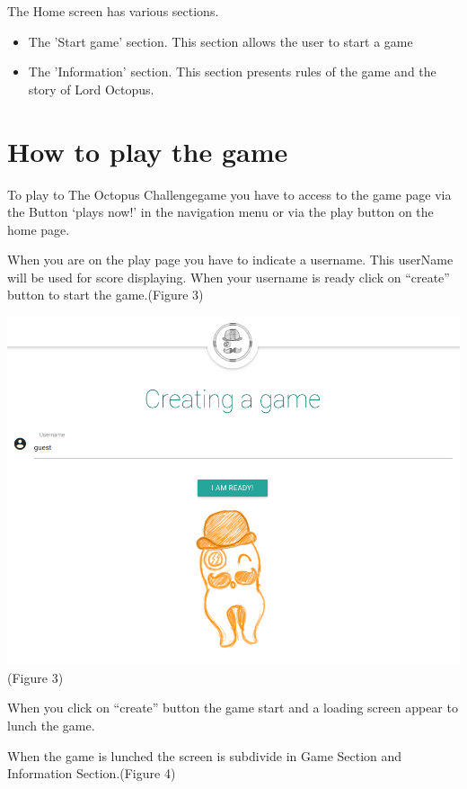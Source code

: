 \documentclass[a4paper,11pt, oneside]{book}
\def\appName{The Octopus Challenge}
\def\octopusName{Lord Octopus}
\begin{document}
The Home screen has various sections.
\begin{itemize}
	\item The 'Start game' section. This section allows the user to start a game
	\item The 'Information' section. This section presents rules of the game and the story of \octopusName.
\end{itemize}


	\section{How to play the game}

	To play to \appName game you have to access to the game page via the Button ‘plays now!’ in the navigation menu or via the play button on the home page.

When you are on the play page you have to indicate a username.
This userName will be used for score displaying.
When your username is ready click on “create” button to start the game.(Figure 3)

\begin{center}
	\includegraphics[width=1\textwidth]{CCreate.png}
	(Figure 3)
\end{center}

When you click on “create” button the game start and a loading screen appear to lunch the game.


When the game is lunched the screen is subdivide in Game Section and Information Section.(Figure 4)
\end{document}
